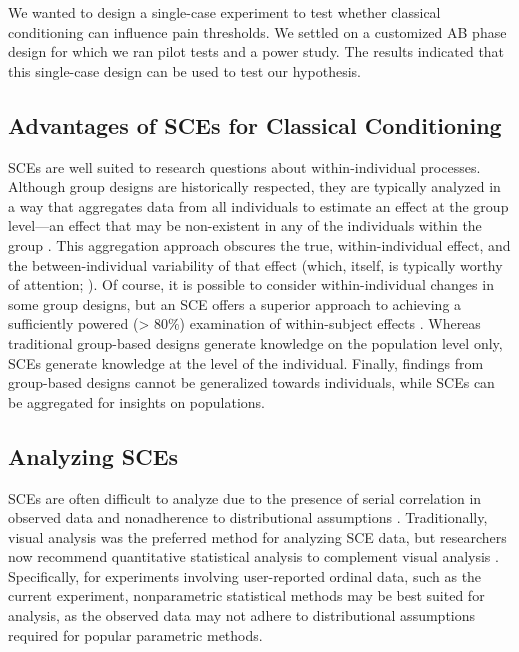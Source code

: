 \documentclass[empirical,issue, twocolumn,authordate]{jote-new-article}
\begin{document}
\begin{takeHomeMessage}
We wanted to design a single-case experiment to test whether classical conditioning can influence pain thresholds. We settled on a customized AB phase design for which we ran pilot tests and a power study. The results indicated that this single-case design can be used to test our hypothesis.
\end{takeHomeMessage}

\subsection{Advantages of SCEs for Classical Conditioning}

SCEs are well suited to research questions about within-individual processes. Although group designs are historically respected, they are typically analyzed in a way that aggregates data from all individuals to estimate an effect at the group level—an effect that may be non-existent in any of the individuals within the group \parencite{Molenaar2009}. This aggregation approach obscures the true, within-individual effect, and the between-individual variability of that effect (which, itself, is typically worthy of attention; ). Of course, it is possible to consider within-individual changes in some group designs, but an SCE offers a superior approach to achieving a sufficiently powered (> 80\%) examination of within-subject effects \parencite{Ferron1995, Ferron1996}. Whereas traditional group-based designs generate knowledge on the population level only, SCEs generate knowledge at the level of the individual. Finally, findings from group-based designs cannot be generalized towards individuals, while SCEs can be aggregated for insights on populations.

\subsection{Analyzing SCEs}

SCEs are often difficult to analyze due to the presence of serial correlation in observed data and nonadherence to distributional assumptions \parencite{Busk1988, Solomon2014, Adams1996, Smith2012}. Traditionally, visual analysis was the preferred method for analyzing SCE data, but researchers now recommend quantitative statistical analysis to complement visual analysis \parencite{Ottenbacher1990, Matyas1990, Kratochwill2010a, Manolov2018, Manolov2017}. Specifically, for experiments involving user-reported ordinal data, such as the current experiment, nonparametric statistical methods may be best suited for analysis, as the observed data may not adhere to distributional assumptions required for popular parametric methods. 
\end{document}
